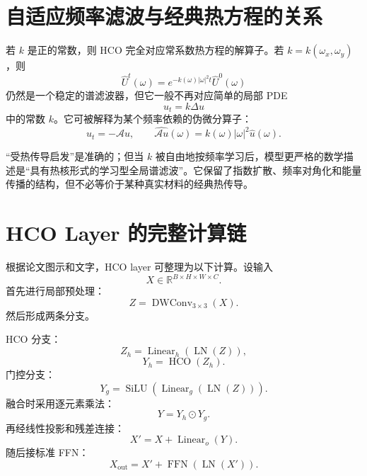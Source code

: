 \documentclass[UTF8,12pt,a4paper,fontset=none]{ctexart}
\numberwithin{equation}{section}
\newcommand{\R}{\mathbb{R}}
\newcommand{\SiLU}{\operatorname{SiLU}}
\newcommand{\LN}{\operatorname{LN}}
\newcommand{\DWConv}{\operatorname{DWConv}}
\begin{document}
\section{自适应频率滤波与经典热方程的关系}

若 $k$ 是正的常数，则 HCO 完全对应常系数热方程的解算子。若 $k=k(\omega_x,\omega_y)$，则
\begin{equation}
  \widehat U^t(\omega)
  =e^{-k(\omega)|\omega|^2t}\widehat U^0(\omega)
\end{equation}
仍然是一个稳定的谱滤波器，但它一般不再对应简单的局部 PDE
\begin{equation}
  u_t=k\Delta u
\end{equation}
中的常数 $k$。它可被解释为某个频率依赖的伪微分算子：
\begin{equation}
  u_t=-\mathcal{A}u,
  \qquad
  \widehat{\mathcal{A}u}(\omega)
  =k(\omega)|\omega|^2\widehat u(\omega).
\end{equation}

\begin{criticalbox}[物理解释的边界]
“受热传导启发”是准确的；但当 $k$ 被自由地按频率学习后，模型更严格的数学描述是“具有热核形式的学习型全局谱滤波”。它保留了指数扩散、频率对角化和能量传播的结构，但不必等价于某种真实材料的经典热传导。
\end{criticalbox}

\section{HCO Layer 的完整计算链}

根据论文图示和文字，HCO layer 可整理为以下计算。设输入
\begin{equation}
  X\in\R^{B\times H\times W\times C}.
\end{equation}
首先进行局部预处理：
\begin{equation}
  Z=\DWConv_{3\times3}(X).
\end{equation}
然后形成两条分支。

HCO 分支：
\begin{equation}
  Z_h=\operatorname{Linear}_h(\LN(Z)),
\end{equation}
\begin{equation}
  Y_h=\operatorname{HCO}(Z_h).
\end{equation}
门控分支：
\begin{equation}
  Y_g=\SiLU(\operatorname{Linear}_g(\LN(Z))).
\end{equation}
融合时采用逐元素乘法：
\begin{equation}
  Y=Y_h\odot Y_g.
\end{equation}
再经线性投影和残差连接：
\begin{equation}
  X'=X+\operatorname{Linear}_o(Y).
  \label{eq:hco-block-reconstruct}
\end{equation}
随后接标准 FFN：
\begin{equation}
  X_{\mathrm{out}}
  =X'+\operatorname{FFN}(\LN(X')).
\end{equation}
\end{document}
